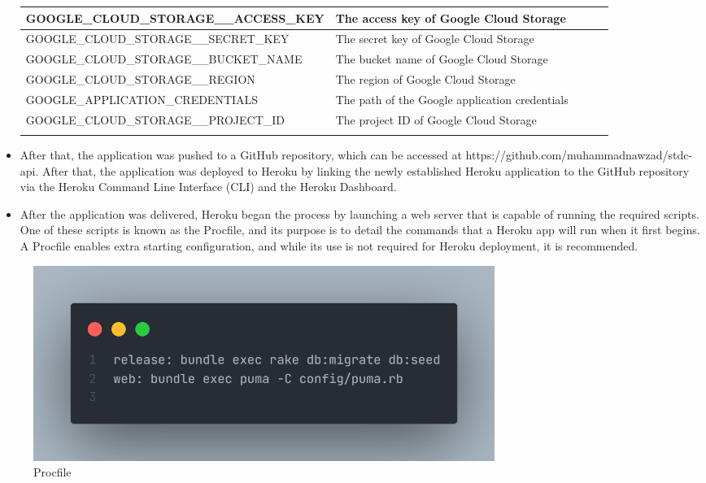 \begin{justify}
\begin{itemize}
\begin{longtable}[c]{|p{9.5cm}|p{5.0cm}|p{7.2cm}|p{7.2cm}|p{7.2cm}|}
        \hline
        GOOGLE\_CLOUD\_STORAGE\_\_ACCESS\_KEY & The access key of Google Cloud Storage \\
        \hline
        GOOGLE\_CLOUD\_STORAGE\_\_SECRET\_KEY & The secret key of Google Cloud Storage \\
        \hline
        GOOGLE\_CLOUD\_STORAGE\_\_BUCKET\_NAME & The bucket name of Google Cloud Storage \\
        \hline
        GOOGLE\_CLOUD\_STORAGE\_\_REGION & The region of Google Cloud Storage \\
        \hline
        GOOGLE\_APPLICATION\_CREDENTIALS & The path of the Google application credentials \\
        \hline
        GOOGLE\_CLOUD\_STORAGE\_\_PROJECT\_ID & The project ID of Google Cloud Storage \\
        \label{Backend ENVs} &\\
        \hline
        \end{longtable}
        
        

        \item After that, the application was pushed to a GitHub repository, which can be accessed at https://github.com/muhammadnawzad/stdc-api. After that, the application was deployed to Heroku by linking the newly established Heroku application to the GitHub repository via the Heroku Command Line Interface (CLI) and the Heroku Dashboard.\\

        \item After the application was delivered, Heroku began the process by launching a web server that is capable of running the required scripts. One of these scripts is known as the Procfile, and its purpose is to detail the commands that a Heroku app will run when it first begins. A Procfile enables extra starting configuration, and while its use is not required for Heroku deployment, it is recommended.\\
    \end{itemize}


    \begin{figure}[H]
        \centerline{\includegraphics[width=150mm,scale=1]{figures/implementation_and_testing/deployment/image.png}}
        \caption{Procfile}
        \label{procfile}
    \end{figure}


\end{justify}

